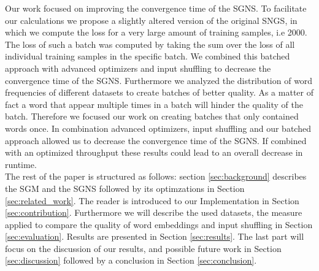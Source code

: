 Our work focused on improving the convergence time of the SGNS. To facilitate our calculations we propose a slightly altered version of the original SNGS, in which we compute the loss for a very large amount of training samples, i.e 2000. The loss of such a batch was computed by taking the sum over the loss of all individual training samples in the specific batch. We combined this batched approach with advanced optimizers and input shuffling to decrease the convergence time of the SGNS. Furthermore we analyzed the distribution of word frequencies of different datasets to create batches of better quality. As a matter of fact a word that appear multiple times in a batch will hinder the quality of the batch. Therefore we focused our work on creating batches that only contained words once. In combination advanced optimizers, input shuffling and our batched approach allowed us to decrease the convergence time of the SGNS. If combined with an optimized throughput these results could lead to an overall decrease in runtime.\\
 The rest of the paper is structured as follows: section \ref{sec:background}  describes the SGM and the SGNS followed by its optimzations in Section \ref{sec:related_work}.  The reader is introduced to our Implementation in Section \ref{sec:contribution}. Furthermore  we will describe the used datasets, the measure applied to compare the quality of word embeddings and input shuffling in Section \ref{sec:evaluation}. Results are presented in  Section \ref{sec:results}. The last part will focus on the discussion of our results, and possible future work in Section \ref{sec:discussion} followed by a conclusion in Section \ref{sec:conclusion}.